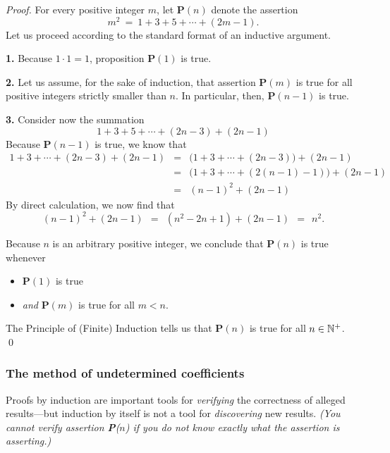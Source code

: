 \begin{proof}
For every positive integer $m$, let {\bf P}$(n)$ denote the assertion
\[ m^2 \ = \ 1 + 3 + 5 + \cdots + (2m-1). \]
Let us proceed according to the standard format of an inductive
argument.

{\bf 1.} Because $1 \cdot 1 = 1$, proposition {\bf P}$(1)$ is true.

{\bf 2.} Let us assume, for the sake of induction, that assertion {\bf
  P}$(m)$ is true for all positive integers strictly smaller than $n$.
In particular, then, {\bf P}$(n-1)$ is true.

{\bf 3.} Consider now the summation
\[ 1 + 3 + 5 + \cdots + (2n-3) + (2n-1) \]
Because {\bf P}$(n-1)$ is true, we know that
\begin{eqnarray*}
1 + 3 + \cdots + (2n-3) + (2n-1)
  & = & 
\big(1 + 3 + \cdots + (2n-3) \big) + (2n-1) \\
  & = &
\big(1 + 3 + \cdots + (2(n-1) -1) \big) + (2n-1) \\
  & = & (n-1)^2 + (2n-1)
\end{eqnarray*}
By direct calculation, we now find that
\[ (n-1)^2 + (2n-1) \ \ = \ \ (n^2 -2n +1) + (2n-1) \ \ = \ \ n^2. \]

\noindent
Because $n$ is an arbitrary positive integer, we conclude that
{\bf P}$(n)$ is true whenever
\begin{itemize}
\item
{\bf P}$(1)$ is true
\item
{\em and}
{\bf P}$(m)$ is true for all $m < n$.
\end{itemize}
The Principle of (Finite) Induction tells us that {\bf P}$(n)$
is true for all $n \in \mathbb{N}^+$.  \qed
\end{proof}


\subsubsection{The method of undetermined coefficients}
\label{sec:undetermined-coefficients1}


Proofs by induction are important tools for {\em verifying} the
correctness of alleged results---but induction by itself is not a tool
for {\em discovering} new results.  {\em (You cannot {\em verify}
  assertion {\bf P}($n$) if you do not know {\em exactly} what the
  assertion is asserting.)}

